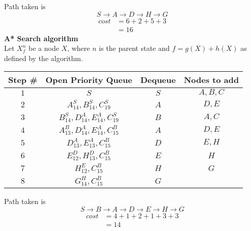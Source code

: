 \begin{enumerate}
\begin{center}
\begin{tabular}{|c|c|c|c|}
            \hline
          \end{tabular}
          \egroup
        \end{center}
        Path taken is
        $$
          S \rightarrow A \rightarrow D \rightarrow H \rightarrow G
        $$
        \begin{align*}
          cost & = 6 + 2 + 5 + 3 \\
               & = 16
        \end{align*}
        \textbf{A* Search algorithm}\\
        Let $X^n_f$ be a node $X$, where $n$ is the parent state and $f=g(X) + h(X)$ as defined by the algorithm.
        \begin{center}
          \bgroup
          \def\arraystretch{1.5}%
          \captionsetup{type=figure}
          \begin{tabular}{|c|c|c|c|}
            \hline
            Step \# & Open Priority Queue                      & Dequeue & Nodes to add \\
            \hline
            $1$     & $S$                                      & $S$     & $A,B,C$      \\
            $2$     & $A^S_{14}, B^S_{14}, C^S_{19}$           & $A$     & $D,E$        \\
            $3$     & $B^S_{14}, D^A_{14}, E^A_{14}, C^S_{19}$ & $B$     & $A,C$        \\
            $4$     & $A^B_{13}, D^A_{14}, E^A_{14}, C^B_{15}$ & $A$     & $D,E$        \\
            $5$     & $D^A_{13}, E^A_{13}, C^B_{15}$           & $D$     & $E,H$        \\
            $6$     & $E^D_{12}, H^D_{13}, C^B_{15}$           & $E$     & $H$          \\
            $7$     & $H^E_{12}, C^B_{15}$                     & $H$     & $G$          \\
            $8$     & $G^H_{14}, C^B_{15}$                     & $G$     &              \\
            \hline
          \end{tabular}
          \egroup
        \end{center}
        Path taken is
        $$
          S \rightarrow B \rightarrow A \rightarrow D \rightarrow E \rightarrow H \rightarrow G
        $$
        \begin{align*}
          cost & = 4 + 1 + 2 + 1 + 3 + 3 \\
               & = 14
        \end{align*}
\end{enumerate}